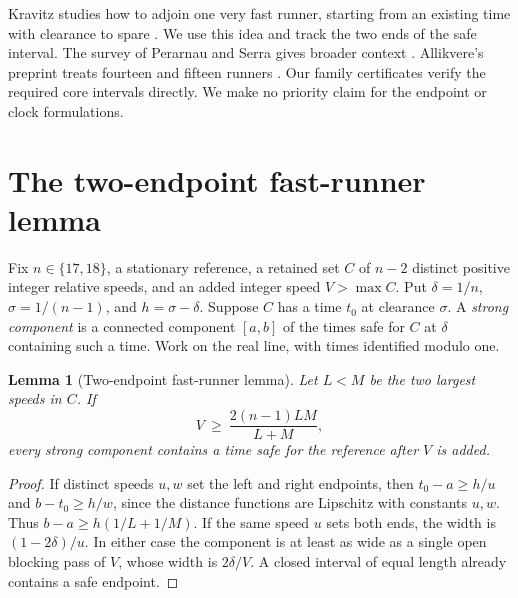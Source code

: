 \documentclass[11pt,letterpaper]{article}
\newtheorem{lemma}{Lemma}
\begin{document}
Kravitz studies how to adjoin one very fast runner, starting from an existing time with clearance to spare \cite[\S6, especially Proposition 6.1]{kravitz}. We use this idea and track the two ends of the safe interval. The survey of Perarnau and Serra gives broader context \cite{survey}. Allikvere's preprint treats fourteen and fifteen runners \cite{allikvere}. Our family certificates verify the required core intervals directly. We make no priority claim for the endpoint or clock formulations.

\newpage
\section{The two-endpoint fast-runner lemma}
Fix \(n\in\{17,18\}\), a stationary reference, a retained set \(C\) of \(n-2\) distinct positive integer relative speeds, and an added integer speed \(V>\max C\). Put \(\delta=1/n\), \(\sigma=1/(n-1)\), and \(h=\sigma-\delta\). Suppose \(C\) has a time \(t_0\) at clearance \(\sigma\). A \emph{strong component} is a connected component \([a,b]\) of the times safe for \(C\) at \(\delta\) containing such a time. Work on the real line, with times identified modulo one.

\begin{lemma}[Two-endpoint fast-runner lemma]\label{lem:width}
Let \(L<M\) be the two largest speeds in \(C\). If
\[
V\ \ge\ \frac{2(n-1)LM}{L+M},
\]
every strong component contains a time safe for the reference after \(V\) is added.
\end{lemma}
\begin{proof}
If distinct speeds \(u,w\) set the left and right endpoints, then
\(t_0-a\ge h/u\) and \(b-t_0\ge h/w\), since the distance functions are Lipschitz with constants \(u,w\). Thus \(b-a\ge h(1/L+1/M)\). If the same speed \(u\) sets both ends, the width is \((1-2\delta)/u\). In either case the component is at least as wide as a single open blocking pass of \(V\), whose width is \(2\delta/V\). A closed interval of equal length already contains a safe endpoint.
\end{proof}
\end{document}
